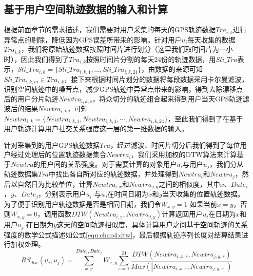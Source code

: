 \subsection{基于用户空间轨迹数据的输入和计算}
根据前面章节的需求描述，我们需要对用户采集的每天的GPS轨迹数据$Tra_{i,k}$进行异常点的剔除，降低因为GPS误差所带来的影响。针对用户$u_{i}$每天收集的数据$Tra_{i,k}$，我们将原始轨迹数据按照时间片进行划分（这里我们取时间片为一小时），因此我们得到了$Tra_{i,k}$按照时间片分割的每天24份的轨迹数据，用$Sli\_Tra$表示，$Sli\_Tra_{i,k}=\{Sli\_Tra_{i,k,1},...,Sli\_Tra_{i,k,24}\}$，由数据的来源可知$Sli\_Tra_{i,k,m} \in Tra_{i,k}$，接下来根据时间片划分的数据将每段数据采用卡尔曼滤波，识别空间轨迹中的噪音点，减少GPS轨迹中异常点带来的影响，得到去除漂移点后的用户分片轨迹$Newtra_{i,k,s}$，将众切分的轨迹组合起来得到用户当天GPS轨迹滤波后的结果$Newtra_{i,k}$，可知$Newtra_{i,k}=\{ Newtra_{i,k,1},Newtra_{i,k,1}, \cdots,Newtra_{i,k,24}\}$，至此我们得到了在基于用户轨迹计算用户社交关系强度这一层的第一维数据的输入。
\par 针对采集到的用户GPS轨迹数据$Tra$，经过滤波、时间片切分后我们得到了每位用户经过处理后的位置轨迹数据集合$Newtra_{i}$，我们采用加权的DTW算法来计算基于$Newtra$的用户间的关系强度。对于需要计算的对象用户$u_{i}$与用户$u_{j}$，我们分从轨迹数据集$Tra$中找出各自所对应的轨迹数据，并处理得到$Newtra_{i}$和$Newtra_{j}$，然后以自然日为比较单位，计算$Newtra_{i,x}$和$Newtra_{j,y}$之间的相似度，其中$x 、 Date_{i}$，$y 、 Date_{j}$，分别表示用户$u_{i}$ 与$u_{j}$在时间日期为$x$和$y$当天收集的位置轨迹数据。为了便于识别用户轨迹数据是否是相同日期，我们令$W_{x,y}=1$ 如果当前$x=y$，否则$W_{x,y}=0$，调用函数$DTW(Newtra_{i,x},Newtra_{j,y})$计算返回用户$u_{i}$在日期为$x$和用户$u_{j}$ 在日期为$y$这天的空间轨迹相似度，具体计算用户之间基于空间轨迹的关系强度的数学公式描述如公式\ref{equ:chap4:dtw}，最后根据轨迹序列长度对结算结果进行加权处理。
\begin{equation}
\label{equ:chap4:dtw}
RS_{dtw}(u_{i},u_{j})=\sum_{x ,y }^{ Date_{i}, Date_{j}}W_{x,y}\sum_{s=1}^{24} \frac{DTW(Newtra_{i,x,s},Newtra_{j,y,s})}{Max(\left | Newtra_{i,x,s},Newtra_{j,y,s}  \right |)}
\end{equation}
